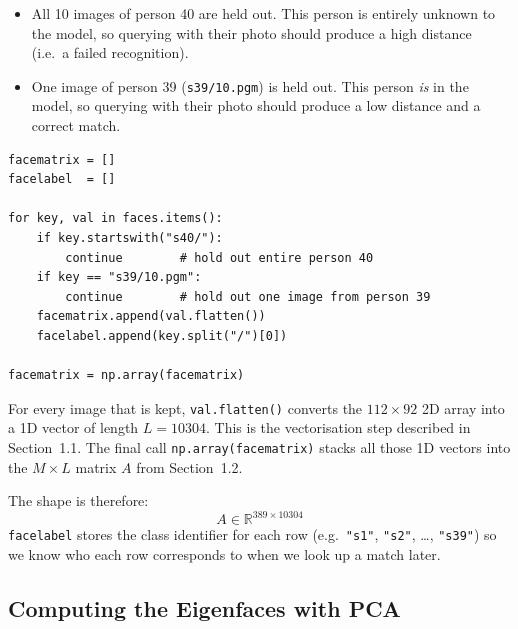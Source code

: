 \documentclass[12pt,a4paper]{article}
\begin{document}
\begin{itemize}
  \item All 10 images of person 40 are held out. This person is entirely
        unknown to the model, so querying with their photo should produce a
        high distance (i.e.\ a failed recognition).
  \item One image of person 39 (\texttt{s39/10.pgm}) is held out. This person
        \emph{is} in the model, so querying with their photo should produce a
        low distance and a correct match.
\end{itemize}

\newpage



\vspace{0.5em}
\begin{minipage}{\linewidth}
\begin{lstlisting}[caption={Building the training matrix}]
facematrix = []
facelabel  = []

for key, val in faces.items():
    if key.startswith("s40/"):
        continue        # hold out entire person 40
    if key == "s39/10.pgm":
        continue        # hold out one image from person 39
    facematrix.append(val.flatten())
    facelabel.append(key.split("/")[0])

facematrix = np.array(facematrix)
\end{lstlisting}
\end{minipage}



For every image that is kept, \texttt{val.flatten()} converts the $112 \times 92$
2D array into a 1D vector of length $L = 10304$. This is the vectorisation
step described in Section~1.1. The final call \texttt{np.array(facematrix)}
stacks all those 1D vectors into the $M \times L$ matrix $A$ from Section~1.2.

The shape is therefore:
\[
A \in \mathbb{R}^{389 \times 10304}
\]
\texttt{facelabel} stores the class identifier for each row (e.g.\ \texttt{"s1"},
\texttt{"s2"}, \ldots, \texttt{"s39"}) so we know who each row corresponds to
when we look up a match later.

\subsection{Computing the Eigenfaces with PCA}
\end{document}
